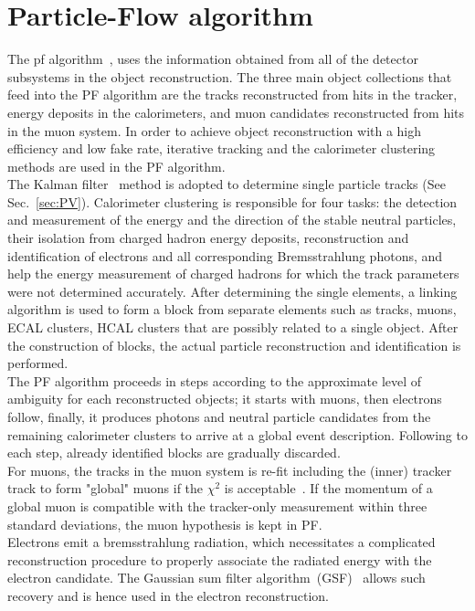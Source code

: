 \section{Particle-Flow algorithm}
\label{sec:PF}
The \acrfull{pf} algorithm~\cite{PF}, uses the information obtained from all of the detector subsystems in the object reconstruction. The three main object collections that feed into the PF algorithm are the tracks reconstructed from hits in the tracker, energy deposits in the calorimeters, and muon candidates reconstructed from hits in the muon system.
In order to achieve object reconstruction with a high efficiency and low fake rate, iterative tracking and the calorimeter clustering methods are used in the PF algorithm.\\
The Kalman filter~\cite{KalmanFilt} method is adopted to determine single particle tracks (See Sec.~\ref{sec:PV}). Calorimeter clustering is responsible for four tasks: the detection and measurement of the energy and the direction of the stable neutral particles, their isolation from charged hadron energy deposits, reconstruction and identification of electrons and all corresponding Bremsstrahlung photons, and help the energy measurement of charged hadrons for which the track parameters were not determined accurately. After determining the single elements, a linking algorithm is used to form a block from separate elements such as tracks, muons, ECAL clusters, HCAL clusters that are possibly related to a single object. After the construction of blocks, the actual particle reconstruction and identification is performed.\\
The PF algorithm proceeds in steps according to the approximate level of ambiguity for each reconstructed objects; it starts with muons, then electrons follow, finally, it produces photons and neutral particle candidates from the remaining calorimeter clusters to arrive at a global event description.
Following to each step, already identified blocks are gradually discarded.\\
For muons, the tracks in the muon system is re-fit including the (inner) tracker track to form "global" muons if the $\chi^2$ is acceptable~\cite{muon7TeV}.
If the momentum of a global muon is compatible with the tracker-only measurement within three standard deviations, the muon hypothesis is kept in PF.\\
Electrons emit a bremsstrahlung radiation, which necessitates a complicated reconstruction procedure to properly associate the radiated energy with the electron candidate. The Gaussian sum filter algorithm~(GSF)~\cite{GSF} allows such recovery and is hence used in the electron reconstruction.
